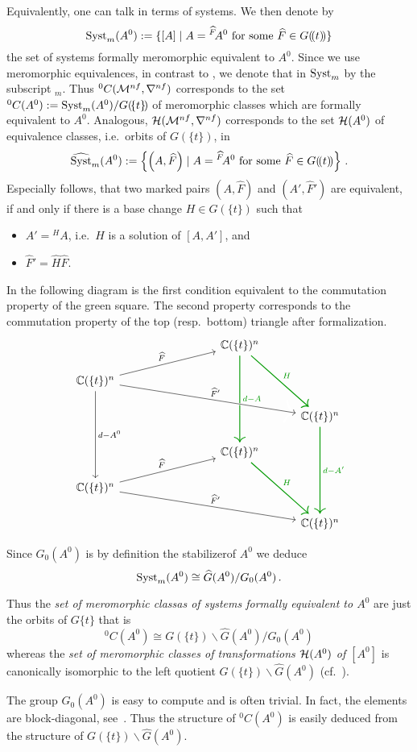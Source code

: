 Equivalently, one can talk in terms of systems. We then denote by
\[
  \operatorname{Syst}_m(A^0):=\{[A]
    \mid A={}^{\widehat F}\!A^0 \text{ for some } \widehat F\in G(\!(t)\!)\}
\]
the set of systems formally meromorphic equivalent to $A^0$.
Since we use meromorphic equivalences, in contrast to \cite{boalch,thboalch},
we denote that in $\operatorname{Syst}_m$ by the subscript ${}_m$.
Thus ${}^0C(\mathcal{M}^{nf},\nabla^{nf})$ corresponds to
the set ${}^0C(A^0):=\operatorname{Syst}_m(A^0)/G(\!\{t\}\!)$ of meromorphic classes which
are formally equivalent to $A^0$.
Analogous, $\mathcal{H}(\mathcal{M}^{nf},\nabla^{nf})$ corresponds to the set $\mathcal{H}(A^0)$ of
equivalence classes, i.e.\ orbits of $G(\!\{t\}\!)$, in
\[
  \widehat{\operatorname{Syst}}_m(A^0):=\left\{\left(A,\widehat F\right)
    \mid A={}^{\widehat F}\!A^0 \text{ for some } \widehat F\in G(\!(t)\!)\right\} \,.
\]
\label{page:ofDefnOfIsomOfMarkedPairs}
Especially follows, that two marked pairs $(A,\hat F)$ and $(A',\hat F')$ are
equivalent, if and only if there is a base change
$H\in G(\!\{t\}\!)$ such that
\begin{itemize}
  \item $A'={}^{H}\!A$, i.e.\ $H$ is a solution of $[A,A']$, and
  \item $\hat F'=\hat H\hat F$\PROBLEM[Source? correct? Maybe $\hat F'=H\hat F$].
\end{itemize}
In the following diagram is the first condition equivalent to the commutation
property of the \textcolor{green!60!black}{green} square. The second property
corresponds to the commutation property of the top (resp.\ bottom) triangle
after formalization\PROBLEM[?].
\[ \begin{tikzcd}[column sep=1cm,row sep=.5cm]
  &&&\C(\{t\})^n \arrow[green!60!black, thick]{ddd}{d-A}
    \arrow[green!60!black, thick]{ddr}{H}
\\\C(\{t\})^n \arrow{rrru}{\hat F}
  \arrow[ultra thick, white]{rrrrd}{\hat F'}
  \arrow{rrrrd}{\hat F'}
  \arrow{ddd}{d-A^0}
\\&&&&\C(\{t\})^n \arrow[green!60!black, thick]{ddd}{d-A'}
\\&&&\C(\{t\})^n \arrow[green!60!black, thick]{ddr}{H}
\\\C(\{t\})^n \arrow{rrru}{\hat F} \arrow{rrrrd}{\hat F'}
\\&&&&\C(\{t\})^n
\end{tikzcd} \]

\begin{lem}
  Since $G_0(A^0)$ is by definition the stabilizer\PROBLEM[correct?] of $A^0$ we
  deduce
  \[
    \operatorname{Syst}_m(A^0)\cong \widehat G(A^0)/G_0(A^0) \,.
  \]
  \begin{s-cor}
    Thus the \emph{set of meromorphic classas of systems formally equivalent
      to $A^0$} are just the orbits of $G\{t\}$ that is
    \[
      {}^0C(A^0)\cong G(\!\{t\}\!)\backslash\hat G(A^0)/G_0(A^0)
    \]
    whereas the \emph{set of meromorphic classes of transformations $\mathcal{H}(A^0)$
    of $[A^0]$} is canonically isomorphic to the left quotient
    $G(\!\{t\}\!)\backslash\hat G(A^0)$ (cf.\ \cite[Lem.1.17]{thboalch}).
  \end{s-cor}
\end{lem}

The group $G_0(A^0)$ is easy to compute and is often trivial. In fact, the
elements are block-diagonal,
see~\cite[77]{Loday2014}.
Thus the structure of ${}^0C(A^0)$ is easily deduced from the structure of
$G(\!\{t\}\!)\backslash\hat G(A^0)$.
